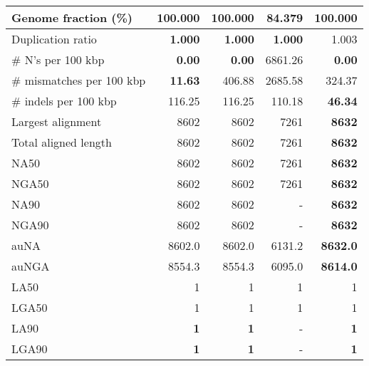 \documentclass[12pt,a4paper]{article}
\begin{document}
\begin{table}[ht]
\begin{center}
\begin{tabular}{|l*{4}{|r}|}
Genome fraction (\%) & {\bf 100.000} & {\bf 100.000} & 84.379 & {\bf 100.000} \\ \hline
Duplication ratio & {\bf 1.000} & {\bf 1.000} & {\bf 1.000} & 1.003 \\ \hline
\# N's per 100 kbp & {\bf 0.00} & {\bf 0.00} & 6861.26 & {\bf 0.00} \\ \hline
\# mismatches per 100 kbp & {\bf 11.63} & 406.88 & 2685.58 & 324.37 \\ \hline
\# indels per 100 kbp & 116.25 & 116.25 & 110.18 & {\bf 46.34} \\ \hline
Largest alignment & 8602 & 8602 & 7261 & {\bf 8632} \\ \hline
Total aligned length & 8602 & 8602 & 7261 & {\bf 8632} \\ \hline
NA50 & 8602 & 8602 & 7261 & {\bf 8632} \\ \hline
NGA50 & 8602 & 8602 & 7261 & {\bf 8632} \\ \hline
NA90 & 8602 & 8602 & - & {\bf 8632} \\ \hline
NGA90 & 8602 & 8602 & - & {\bf 8632} \\ \hline
auNA & 8602.0 & 8602.0 & 6131.2 & {\bf 8632.0} \\ \hline
auNGA & 8554.3 & 8554.3 & 6095.0 & {\bf 8614.0} \\ \hline
LA50 & 1 & 1 & 1 & 1 \\ \hline
LGA50 & 1 & 1 & 1 & 1 \\ \hline
LA90 & {\bf 1} & {\bf 1} & - & {\bf 1} \\ \hline
LGA90 & {\bf 1} & {\bf 1} & - & {\bf 1} \\ \hline
\end{tabular}
\end{center}
\end{table}
\end{document}

